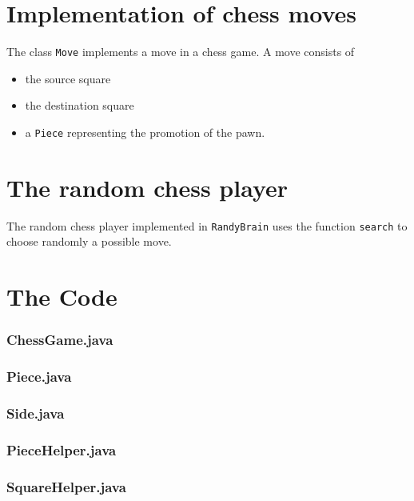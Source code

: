 \documentclass [12pt ,a4paper, naustrian]{scrartcl}
\theoremstyle{plain}
\theoremstyle{definition}
\theoremstyle{remark}
\begin{document}
\section{Implementation of chess moves}
		The class \verb+Move+ implements a move in a chess game. A move consists of 
		\begin{itemize}
			\item the source square
			\item the destination square
			\item a \verb+Piece+ representing the promotion of the pawn.
		\end{itemize}
		
\section{The random chess player}
	The random chess player implemented in \verb+RandyBrain+ uses the function \verb+search+ to choose randomly a possible move.

\section{The Code}

\subsubsection*{ChessGame.java}


\subsubsection*{Piece.java}


\subsubsection*{Side.java}


\subsubsection*{PieceHelper.java}


\subsubsection*{SquareHelper.java}

\end{document}
